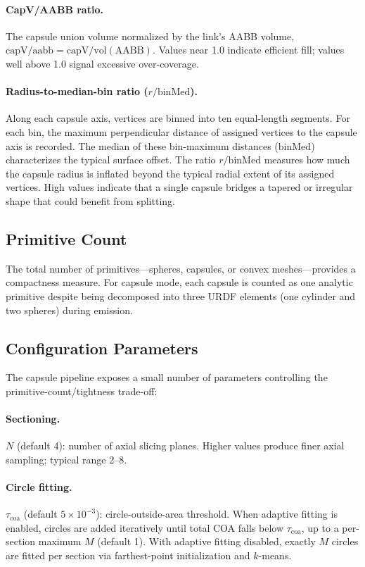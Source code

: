 \paragraph{CapV/AABB ratio.}
The capsule union volume normalized by the link's AABB volume, $\mathrm{capV/aabb} = \mathrm{capV} / \mathrm{vol}(\mathrm{AABB})$. Values near 1.0 indicate efficient fill; values well above 1.0 signal excessive over-coverage.

\paragraph{Radius-to-median-bin ratio ($r/\mathrm{binMed}$).}
Along each capsule axis, vertices are binned into ten equal-length segments.
For each bin, the maximum perpendicular distance of assigned vertices to the capsule axis is recorded.
The median of these bin-maximum distances ($\mathrm{binMed}$) characterizes the typical surface offset.
The ratio $r / \mathrm{binMed}$ measures how much the capsule radius is inflated beyond the typical radial extent of its assigned vertices.
High values indicate that a single capsule bridges a tapered or irregular shape that could benefit from splitting.

\subsection{Primitive Count}

The total number of primitives---spheres, capsules, or convex meshes---provides a compactness measure.
For capsule mode, each capsule is counted as one analytic primitive despite being decomposed into three URDF elements (one cylinder and two spheres) during emission.

\subsection{Configuration Parameters}

The capsule pipeline exposes a small number of parameters controlling the primitive-count/tightness trade-off:

\paragraph{Sectioning.}
$N$ (default 4): number of axial slicing planes. Higher values produce finer axial sampling; typical range 2--8.

\paragraph{Circle fitting.}
$\tau_{\mathrm{coa}}$ (default $5 \times 10^{-3}$): circle-outside-area threshold. When adaptive fitting is enabled, circles are added iteratively until total COA falls below $\tau_{\mathrm{coa}}$, up to a per-section maximum $M$ (default 1). With adaptive fitting disabled, exactly $M$ circles are fitted per section via farthest-point initialization and $k$-means.

